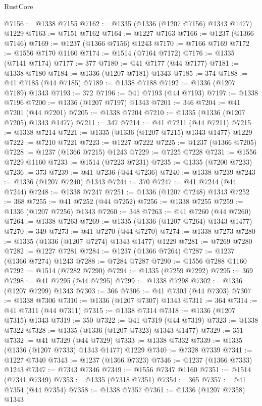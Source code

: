 \begin{lexlean}{RustCore}
\begin{coremodule}
@7156 := @1338 @7155
@7162 := @1335 (@1336 (@1207 @7156) @1343 @1477) @1229
@7163 := @7151 @7162
@7164 := @1227 @7163
@7166 := @1237 (@1366 @7146)
@7169 := @1237 (@1366 @7156) @1243
@7170 := @7166 @7169
@7172 := @1556 @7170 @1160
@7174 := @1514 (@7164 @7172)
@7176 := @1335 (@7141 @7174)
@7177 := 377
@7180 := @41 @7177 (@44 @7177)
@7181 := @1338 @7180
@7184 := @1336 (@1207 @7181) @1343
@7185 := 374
@7188 := @41 @7185 (@44 @7185)
@7189 := @1338 @7188
@7192 := @1336 (@1207 @7189) @1343
@7193 := 372
@7196 := @41 @7193 (@44 @7193)
@7197 := @1338 @7196
@7200 := @1336 (@1207 @7197) @1343
@7201 := 346
@7204 := @41 @7201 (@44 @7201)
@7205 := @1338 @7204
@7210 := @1335 (@1336 (@1207 @7205) @1343 @1477)
@7211 := 347
@7214 := @41 @7211 (@44 @7211)
@7215 := @1338 @7214
@7221 := @1335 (@1336 (@1207 @7215) @1343 @1477) @1229
@7222 := @7210 @7221
@7223 := @1227 @7222
@7225 := @1237 (@1366 @7205)
@7228 := @1237 (@1366 @7215) @1243
@7229 := @7225 @7228
@7231 := @1556 @7229 @1160
@7233 := @1514 (@7223 @7231)
@7235 := @1335 (@7200 @7233)
@7236 := 373
@7239 := @41 @7236 (@44 @7236)
@7240 := @1338 @7239
@7243 := @1336 (@1207 @7240) @1343
@7244 := 370
@7247 := @41 @7244 (@44 @7244)
@7248 := @1338 @7247
@7251 := @1336 (@1207 @7248) @1343
@7252 := 368
@7255 := @41 @7252 (@44 @7252)
@7256 := @1338 @7255
@7259 := @1336 (@1207 @7256) @1343
@7260 := 348
@7263 := @41 @7260 (@44 @7260)
@7264 := @1338 @7263
@7269 := @1335 (@1336 (@1207 @7264) @1343 @1477)
@7270 := 349
@7273 := @41 @7270 (@44 @7270)
@7274 := @1338 @7273
@7280 := @1335 (@1336 (@1207 @7274) @1343 @1477) @1229
@7281 := @7269 @7280
@7282 := @1227 @7281
@7284 := @1237 (@1366 @7264)
@7287 := @1237 (@1366 @7274) @1243
@7288 := @7284 @7287
@7290 := @1556 @7288 @1160
@7292 := @1514 (@7282 @7290)
@7294 := @1335 (@7259 @7292)
@7295 := 369
@7298 := @41 @7295 (@44 @7295)
@7299 := @1338 @7298
@7302 := @1336 (@1207 @7299) @1343
@7303 := 366
@7306 := @41 @7303 (@44 @7303)
@7307 := @1338 @7306
@7310 := @1336 (@1207 @7307) @1343
@7311 := 364
@7314 := @41 @7311 (@44 @7311)
@7315 := @1338 @7314
@7318 := @1336 (@1207 @7315) @1343
@7319 := 350
@7322 := @41 @7319 (@44 @7319)
@7323 := @1338 @7322
@7328 := @1335 (@1336 (@1207 @7323) @1343 @1477)
@7329 := 351
@7332 := @41 @7329 (@44 @7329)
@7333 := @1338 @7332
@7339 := @1335 (@1336 (@1207 @7333) @1343 @1477) @1229
@7340 := @7328 @7339
@7341 := @1227 @7340
@7343 := @1237 (@1366 @7323)
@7346 := @1237 (@1366 @7333) @1243
@7347 := @7343 @7346
@7349 := @1556 @7347 @1160
@7351 := @1514 (@7341 @7349)
@7353 := @1335 (@7318 @7351)
@7354 := 365
@7357 := @41 @7354 (@44 @7354)
@7358 := @1338 @7357
@7361 := @1336 (@1207 @7358) @1343

\end{coremodule}
\end{lexlean}
